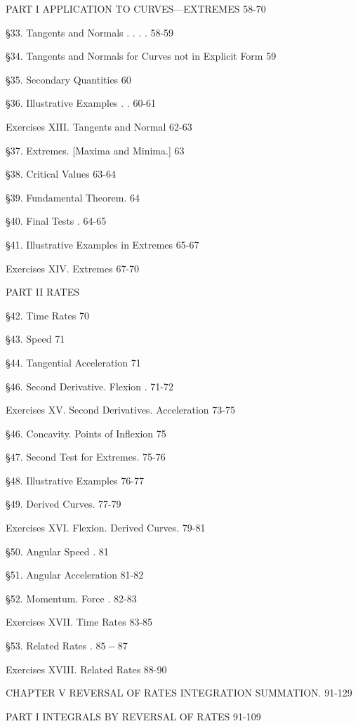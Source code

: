 \documentclass[12pt]{article}
\begin{document}
\begin{center}
PART I APPLICATION TO CURVES---EXTREMES 58-70
\end{center}

\S 33. Tangents and Normals . . . . 58-59

\S 34. Tangents and Normals for Curves not in Explicit Form 59

\S 35. Secondary Quantities 60

\S 36. Illustrative Examples . . 60-61

Exercises XIII. Tangents and Normal 62-63

\S 37. Extremes. [Maxima and Minima.] 63

\S 38. Critical Values 63-64

\S 39. Fundamental Theorem. 64

\S 40. Final Tests . 64-65

\S 41. Illustrative Examples in Extremes 65-67

Exercises XIV. Extremes 67-70

PART II RATES 

\S 42. Time Rates 70

\S 43. Speed 71
%
%

\S 44. Tangential Acceleration 71

\S 46. Second  Derivative. Flexion .  71-72

Exercises XV. Second Derivatives. Acceleration 73-75

\S 46. Concavity. Points of Inflexion 75

\S 47. Second Test for Extremes. 75-76

\S 48. Illustrative Examples 76-77

\S 49. Derived Curves.  77-79

Exercises XVI. Flexion. Derived Curves. 79-81

\S 50. Angular Speed . 81

\S 51. Angular Acceleration 81-82

\S 52. Momentum. Force . 82-83

Exercises XVII. Time Rates 83-85

\S 53. Related Rates . $85-87$

Exercises XVIII. Related Rates 88-90

CHAPTER V REVERSAL OF RATES INTEGRATION SUMMATION. 91-129

\begin{center}
PART I INTEGRALS BY REVERSAL OF RATES 91-109
\end{center}
\end{document}
